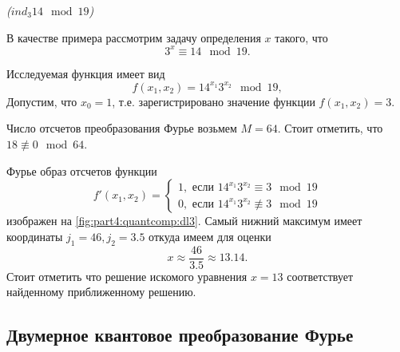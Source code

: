 \begin{example}
\emph{($ind_3{14} \mod{19}$)}
%

В качестве примера рассмотрим задачу определения $x$ такого, что 
\[
3^x \equiv 14 \mod 19.
\]

Исследуемая функция имеет вид
\[
f(x_1, x_2) = 14^{x_1} 3^{x_2} \mod 19,
\]
Допустим, что $x_0 = 1$, т.е. зарегистрировано значение функции
$f(x_1, x_2) = 3$.



Число отсчетов преобразования Фурье возьмем $M=64$. Стоит отметить,
что $18 \not\equiv 0 \mod 64$.

Фурье образ отсчетов функции 
\[
f'(x_1, x_2) = 
\begin{cases}
1, \mbox{ если } 14^{x_1} 3^{x_2} \equiv 3 \mod 19 \\
0, \mbox{ если } 14^{x_1} 3^{x_2} \not\equiv 3 \mod 19 
\end{cases}
\]
изображен на \autoref{fig:part4:quantcomp:dl3}. Самый нижний максимум
имеет координаты $j_1 = 46, j_2 = 3.5$ откуда имеем для оценки 
\[
x \approx \frac{46}{3.5} \approx 13.14.
\]
Стоит отметить что решение искомого уравнения $x = 13$ соответствует
найденному приближенному решению.
\label{ex:part4:quantcomp:discretlog:periodfinding2}
\end{example}


\subsection{Двумерное квантовое преобразование Фурье}




